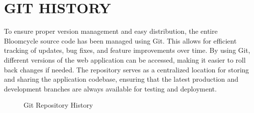 \chapter{GIT HISTORY }
To ensure proper version management and easy distribution, the entire Bloomcycle source code has been managed using Git. This allows for efficient tracking of updates, bug fixes, and feature improvements over time. By using Git, different versions of the web application can be accessed, making it easier to roll back changes if needed. The repository serves as a centralized location for storing and sharing the application codebase, ensuring that the latest production and development branches are always available for testing and deployment.

\begin{figure}[H]
    \centering
    \caption{Git Repository History}
    \label{fig:git_history}
\end{figure}